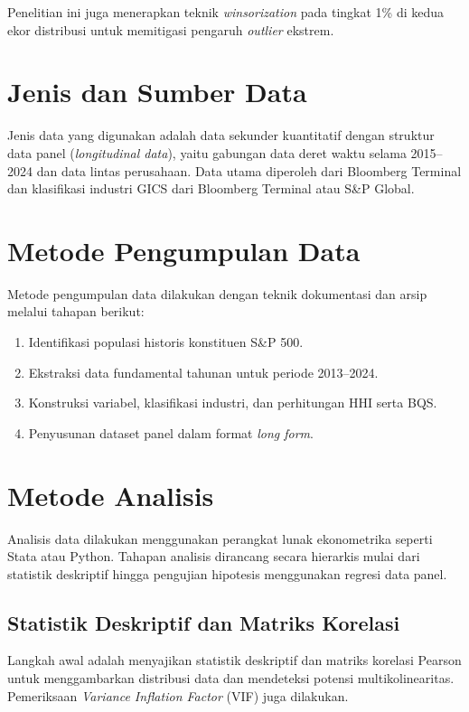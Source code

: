 \documentclass[12pt,a4paper]{report}
\begin{document}
Penelitian ini juga menerapkan teknik \textit{winsorization} pada tingkat 1\% di kedua ekor distribusi untuk memitigasi pengaruh \textit{outlier} ekstrem.

\section{Jenis dan Sumber Data}

Jenis data yang digunakan adalah data sekunder kuantitatif dengan struktur data panel (\textit{longitudinal data}), yaitu gabungan data deret waktu selama 2015--2024 dan data lintas perusahaan. Data utama diperoleh dari Bloomberg Terminal dan klasifikasi industri GICS dari Bloomberg Terminal atau S\&P Global.

\section{Metode Pengumpulan Data}

Metode pengumpulan data dilakukan dengan teknik dokumentasi dan arsip melalui tahapan berikut:

\begin{enumerate}
    \item Identifikasi populasi historis konstituen S\&P 500.
    \item Ekstraksi data fundamental tahunan untuk periode 2013--2024.
    \item Konstruksi variabel, klasifikasi industri, dan perhitungan HHI serta BQS.
    \item Penyusunan dataset panel dalam format \textit{long form}.
\end{enumerate}

\section{Metode Analisis}

Analisis data dilakukan menggunakan perangkat lunak ekonometrika seperti Stata atau Python. Tahapan analisis dirancang secara hierarkis mulai dari statistik deskriptif hingga pengujian hipotesis menggunakan regresi data panel.

\subsection{Statistik Deskriptif dan Matriks Korelasi}

Langkah awal adalah menyajikan statistik deskriptif dan matriks korelasi Pearson untuk menggambarkan distribusi data dan mendeteksi potensi multikolinearitas. Pemeriksaan \textit{Variance Inflation Factor} (VIF) juga dilakukan.
\end{document}
